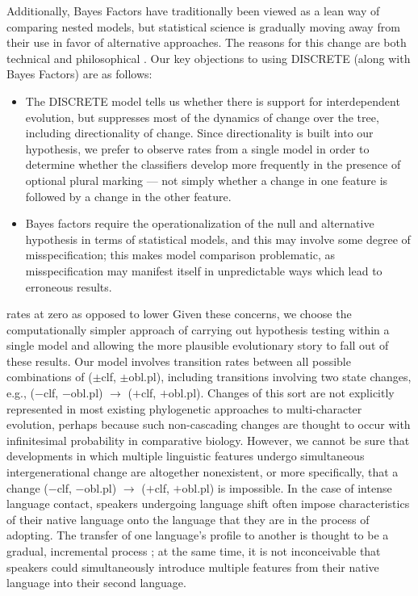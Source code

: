 \documentclass[11pt]{article}
\begin{document}
{Additionally, Bayes Factors have traditionally been viewed as a lean way of comparing nested models, but statistical science is gradually moving away from their use in favor of alternative approaches. 
The reasons for this change are both technical and philosophical \citep{GelmanShalizi2013}. 
Our key objections to using DISCRETE (along with Bayes Factors) are as follows:
\begin{itemize}
\item The DISCRETE model tells us whether there is support for interdependent evolution, but suppresses most of the dynamics of change over the tree, including directionality of change. Since directionality is built into our hypothesis, we prefer to observe rates from a single model in order to determine whether the classifiers develop more frequently in the presence of optional plural marking --- not simply whether a change in one feature is followed by a change in the other feature.
\item Bayes factors require the operationalization of the null and alternative hypothesis in terms of statistical models, and this may involve some degree of misspecification; this makes model comparison problematic, as misspecification may manifest itself in unpredictable ways which lead to erroneous results. 
\end{itemize}
{\color{cyan} rates at zero as opposed to lower}
Given these concerns, we choose the computationally simpler approach of carrying out hypothesis testing within a single model \citep[cf.][]{Kruschke2011} and allowing the more plausible evolutionary story to fall out of these results. 
Our model involves transition rates between all possible combinations of {\sc ($\pm$clf, $\pm$obl.pl)}, including transitions involving two state changes, e.g., {\sc ($-$clf, $-$obl.pl)} $\rightarrow$ {\sc ($+$clf, $+$obl.pl)}. 
Changes of this sort are not explicitly represented in most existing phylogenetic approaches to multi-character evolution, perhaps because such non-cascading changes are thought to occur with infinitesimal probability in comparative biology. 
However, we cannot be sure that developments 
in which multiple linguistic features undergo simultaneous intergenerational change are altogether nonexistent, or more specifically, that a change {\sc ($-$clf, $-$obl.pl)} $\rightarrow$ {\sc ($+$clf, $+$obl.pl)} is impossible. 
In the case of intense language contact, speakers undergoing language shift often impose characteristics of their native language onto the language that they are in the process of adopting. 
The transfer of one language's profile to another is thought to be a gradual, incremental process \citep{Ross1996,Ross2007}; at the same time, it is not inconceivable that speakers could simultaneously introduce multiple features from their native language into their second language. 
}
\end{document}
